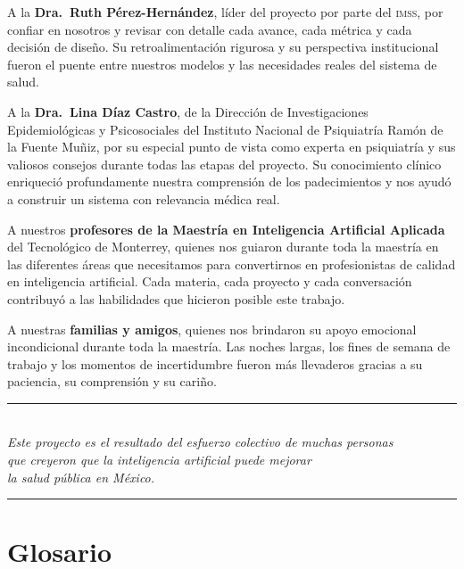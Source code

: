 \documentclass[12pt, letterpaper]{article}
\newcommand{\imss}{\textnormal{\textsc{imss}}}
\begin{document}
A la \textbf{Dra.~Ruth Pérez-Hernández}, líder del proyecto por parte del \imss{}, por confiar en nosotros y revisar con detalle cada avance, cada métrica y cada decisión de diseño. Su retroalimentación rigurosa y su perspectiva institucional fueron el puente entre nuestros modelos y las necesidades reales del sistema de salud.

A la \textbf{Dra.~Lina Díaz Castro}, de la Dirección de Investigaciones Epidemiológicas y Psicosociales del Instituto Nacional de Psiquiatría Ramón de la Fuente Muñiz, por su especial punto de vista como experta en psiquiatría y sus valiosos consejos durante todas las etapas del proyecto. Su conocimiento clínico enriqueció profundamente nuestra comprensión de los padecimientos y nos ayudó a construir un sistema con relevancia médica real.

A nuestros \textbf{profesores de la Maestría en Inteligencia Artificial Aplicada} del Tecnológico de Monterrey, quienes nos guiaron durante toda la maestría en las diferentes áreas que necesitamos para convertirnos en profesionistas de calidad en inteligencia artificial. Cada materia, cada proyecto y cada conversación contribuyó a las habilidades que hicieron posible este trabajo.

A nuestras \textbf{familias y amigos}, quienes nos brindaron su apoyo emocional incondicional durante toda la maestría. Las noches largas, los fines de semana de trabajo y los momentos de incertidumbre fueron más llevaderos gracias a su paciencia, su comprensión y su cariño.

\begin{center}
\vspace{0.5cm}
\textcolor{coolgray}{\rule{0.5\textwidth}{0.4pt}}\\[0.4cm]
{\color{teal}\itshape Este proyecto es el resultado del esfuerzo colectivo de muchas personas\\que creyeron que la inteligencia artificial puede mejorar\\la salud pública en México.}\\[0.3cm]
\textcolor{coolgray}{\rule{0.5\textwidth}{0.4pt}}
\end{center}

\newpage
\section{Glosario}\label{sec:glosario}
\end{document}
